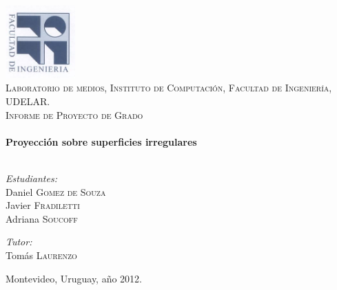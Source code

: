 ﻿\begin{titlepage}

\begin{center}

\includegraphics[width=0.2\textwidth]{./Portada/logo}\\[1cm]

\textsc{\LARGE Laboratorio de medios, Instituto de Computación, Facultad de Ingeniería, UDELAR.}\\[1.5cm]

\textsc{\Large Informe de Proyecto de Grado}\\[0.5cm]

\HRule \\[0.4cm]
{ \huge \bfseries Proyección sobre superficies irregulares}\\[0.4cm]

\HRule \\[1.5cm]

\begin{minipage}{0.45\textwidth}
\begin{flushleft} \large
\emph{Estudiantes:}\\
Daniel \textsc{Gomez de Souza}\\
Javier \textsc{Fradiletti}\\
Adriana \textsc{Soucoff}
\end{flushleft}
\end{minipage}
\begin{minipage}{0.45\textwidth}
\begin{flushright} \large
\emph{Tutor:} \\
Tomás \textsc{Laurenzo}
\end{flushright}
\end{minipage}

\vfill

{\large Montevideo, Uruguay, año 2012.}

\end{center}

\end{titlepage} 